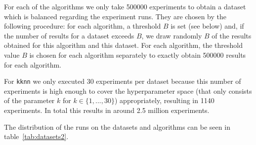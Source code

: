 \documentclass{article}
\begin{document}
For each of the algorithms we only take 500000 experiments to obtain a dataset which is balanced regarding the experiment runs.  
They are chosen by the following procedure: for each algorithm, a threshold $B$ is set (see below) and, if the number of results for a dataset exceeds $B$, we draw randomly $B$ of the results obtained for this algorithm and this dataset. For each algorithm, the threshold value $B$ is chosen for each algorithm separately to exactly obtain 500000 results for each algorithm. 

For \texttt{kknn} we only executed 30 experiments per dataset because this number of experiments is high enough
to cover the hyperparameter space (that only consists of the parameter $k$ for $k \in \{1,...,30\}$) appropriately, resulting in 1140 experiments.
In total this results in around 2.5 million experiments.

The distribution of the runs on the datasets and algorithms can be seen in table~\ref{tab:datasets2}.
\end{document}

